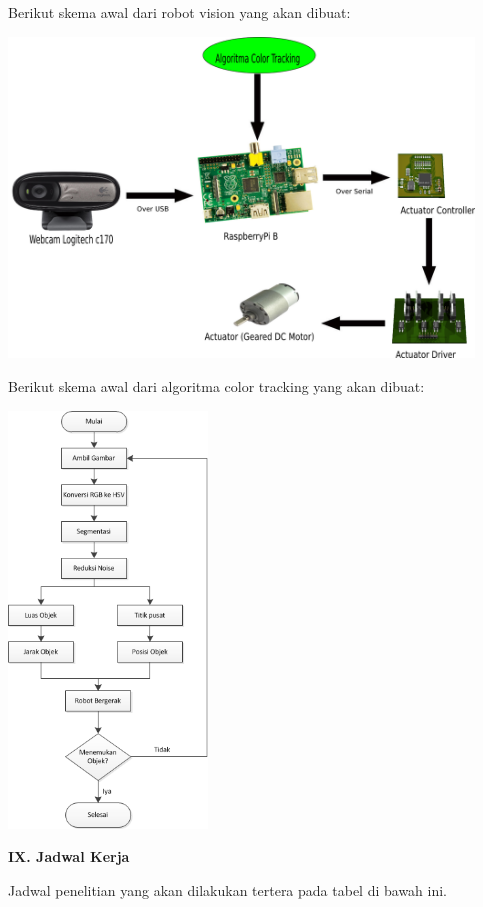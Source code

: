 \documentclass[a4paper,12pt]{article}
\begin{document}
Berikut skema awal dari robot vision yang akan dibuat:

\begin{center}
 \includegraphics[width=350pt]{desain_awal}
\end{center}

Berikut skema awal dari algoritma color tracking yang akan dibuat:

\begin{center}
 \includegraphics[width=150pt]{flow2}
\end{center}

\newpage
\noindent \textbf{IX. \hspace{9pt} Jadwal Kerja}

Jadwal penelitian yang akan dilakukan tertera pada tabel di bawah ini.
\end{document}
